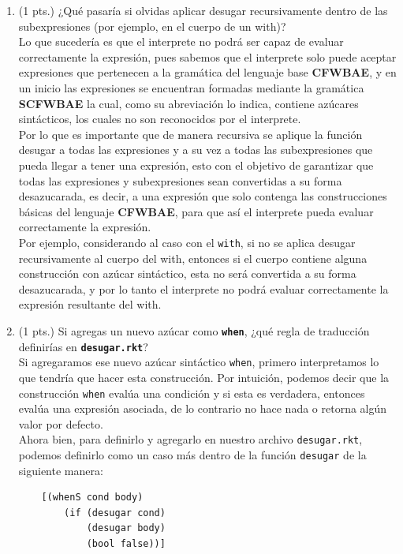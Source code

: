\documentclass[11pt]{article}
\begin{document}
\begin{enumerate}
    \item (1 pts.) ¿Qué pasaría si olvidas aplicar desugar recursivamente dentro de las subexpresiones (por ejemplo, en el cuerpo de un with)?\\
    Lo que sucedería es que el interprete no podrá ser capaz de evaluar correctamente la expresión, pues sabemos que el interprete solo puede aceptar expresiones que pertenecen a la gramática del lenguaje base \textbf{CFWBAE}, y en un inicio las expresiones se encuentran formadas mediante la gramática \textbf{SCFWBAE} la cual, como su abreviación lo indica, contiene azúcares sintácticos, los cuales no son reconocidos por el interprete.\\
    Por lo que es importante que de manera recursiva se aplique la función desugar a todas las expresiones y a su vez a todas las subexpresiones que pueda llegar a tener una expresión, esto con el objetivo de garantizar que todas las expresiones y subexpresiones sean convertidas a su forma desazucarada, es decir, a una expresión que solo contenga las construcciones básicas del lenguaje \textbf{CFWBAE}, para que así el interprete pueda evaluar correctamente la expresión.\\
    Por ejemplo, considerando al caso con el \texttt{with}, si no se aplica desugar recursivamente al cuerpo del with, entonces si el cuerpo contiene alguna construcción con azúcar sintáctico, esta no será convertida a su forma desazucarada, y por lo tanto el interprete no podrá evaluar correctamente la expresión resultante del with.

    \item (1 pts.) Si agregas un nuevo azúcar como \texttt{\textbf{when}}, ¿qué regla de traducción definirías en \texttt{\textbf{desugar.rkt}}?\\
    Si agregaramos ese nuevo azúcar sintáctico \texttt{when}, primero interpretamos lo que tendría que hacer esta construcción. Por intuición, podemos decir que la construcción \texttt{when} evalúa una condición y si esta es verdadera, entonces evalúa una expresión asociada, de lo contrario no hace nada o retorna algún valor por defecto.\\
    Ahora bien, para definirlo y agregarlo en nuestro archivo \texttt{desugar.rkt}, podemos definirlo como un caso más dentro de la función \texttt{desugar} de la siguiente manera:\\
    \begin{lstlisting}
    [(whenS cond body)
        (if (desugar cond)
            (desugar body)
            (bool false))] 
    \end{lstlisting}


\end{enumerate}
\end{document}
